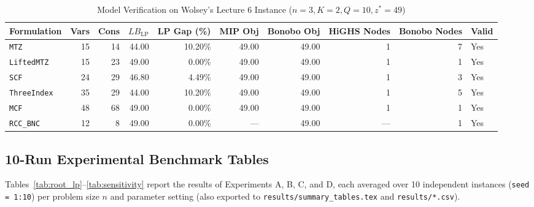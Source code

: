 \documentclass[11pt,a4paper]{article}
\begin{document}
\begin{table}[htbp]
\centering
\caption{Model Verification on Wolsey's Lecture 6 Instance ($n=3, K=2, Q=10, z^*=49$)}
\label{tab:wolsey}
\small
\begin{tabular}{lrrrrrrrrl}
\toprule
Formulation & Vars & Cons & $LB_{\text{LP}}$ & LP Gap (\%) & MIP Obj & Bonobo Obj & HiGHS Nodes & Bonobo Nodes & Valid \\
\midrule
\texttt{MTZ}        & 15 & 14 & 44.00 & 10.20\% & 49.00 & 49.00 & 1 & 7 & Yes \\
\texttt{LiftedMTZ}  & 15 & 23 & 49.00 &  0.00\% & 49.00 & 49.00 & 1 & 1 & Yes \\
\texttt{SCF}        & 24 & 29 & 46.80 &  4.49\% & 49.00 & 49.00 & 1 & 3 & Yes \\
\texttt{ThreeIndex} & 35 & 29 & 44.00 & 10.20\% & 49.00 & 49.00 & 1 & 5 & Yes \\
\texttt{MCF}        & 48 & 68 & 49.00 &  0.00\% & 49.00 & 49.00 & 1 & 1 & Yes \\
\texttt{RCC\_BNC}   & 12 &  8 & 49.00 &  0.00\% &   --- & 49.00 & --- & 1 & Yes \\
\bottomrule
\end{tabular}
\end{table}

\subsection{10-Run Experimental Benchmark Tables}
Tables~\ref{tab:root_lp}--\ref{tab:sensitivity} report the results of Experiments A, B, C, and D, each averaged over 10 independent instances (\texttt{seed = 1:10}) per problem size $n$ and parameter setting (also exported to \texttt{results/summary\_tables.tex} and \texttt{results/*.csv}).
\end{document}
